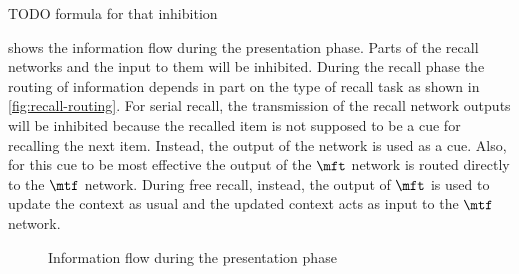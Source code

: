 TODO formula for that inhibition

 shows the information flow during the presentation phase.
Parts of the recall networks and the input to them will be inhibited.
During the recall phase the routing of information depends in part on the type of recall task as shown in \cref{fig:recall-routing}.
For serial recall, the transmission of the recall network outputs will be inhibited because the recalled item is not supposed to be a cue for recalling the next item.
Instead, the output of the  network is used as a cue.
Also, for this cue to be most effective the output of the $\mft$ network is routed directly to the $\mtf$ network.
During free recall, instead, the output of $\mft$ is used to update the context as usual and the updated context acts as input to the $\mtf$ network.
\begin{figure}
    \centering
    \caption{Information flow during the presentation phase}\label{fig:pres-routing}
\end{figure}
